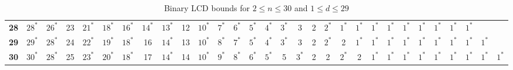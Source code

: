 \begin{sidewaystable}
\begin{tabular}{|c| c c c c c c c c c c c c c c c c c c c c c c c c c c c c c |}
\textbf{28} & $28^*$ & $26^*$ & 23 & $21^*$ & $18^*$ & $16^*$ & $14^*$ & $13^*$ & 12 & $10^*$ & $7^*$ & $6^*$ & $5^*$ & $4^*$ & $3^*$ & 3 & 2 & $2^*$ & $1^*$ & $1^*$ & $1^*$ & $1^*$ & $1^*$ & $1^*$ & $1^*$ & $1^*$ & $1^*$ & & \\
\textbf{29} & $29^*$ & $28^*$ & 24 & $22^*$ & $19^*$ & $18^*$ & 16 & $14^*$ & 13 & $10^*$ & $8^*$ & $7^*$ & $5^*$ & $4^*$ & $3^*$ & 3 & 2 & $2^*$ & 2 & $1^*$ & $1^*$ & $1^*$ & $1^*$ & $1^*$ & $1^*$ & $1^*$ & $1^*$ & $1^*$ & \\
\textbf{30} & $30^*$ & $28^*$ & 25 & $23^*$ & $20^*$ & $18^*$ & 17 & $14^*$ & 14 & $10^*$ & $9^*$ & $8^*$ & $6^*$ & $5^*$ & 5 & $3^*$ & 2 & 2 & $2^*$ & 2 & $1^*$ & $1^*$ & $1^*$ & $1^*$ & $1^*$ & $1^*$ & $1^*$ & $1^*$ & $1^*$ \\
\hline
\end{tabular}
\caption{Binary LCD bounds for $2 \leq n \leq 30$ and $1 \leq d \leq 29$}
\label{tab:lp_tables_q2_2_30_1_29}
\end{sidewaystable}